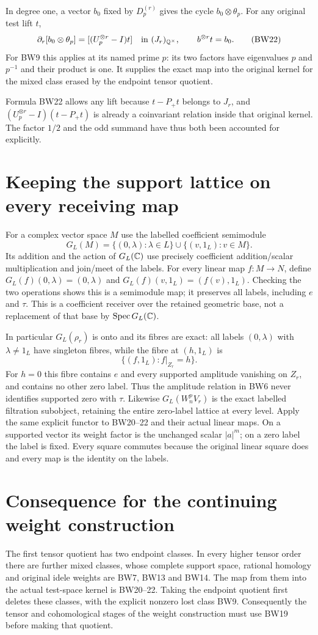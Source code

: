 In degree one, a vector $b_0$ fixed by $D_p^{(r)}$ gives the cycle
$b_0\otimes\theta_p$. For any original test lift $t$,
\[
 \partial_r[b_0\otimes\theta_p]=[(U_p^{\otimes r}-I)t]
       \quad\text{in }(J_r)_{\mathbb Q^\times},\qquad b^{\otimes r}t=b_0.
 \tag{BW22}
\]
For BW9 this applies at its named prime $p$: its two factors have
eigenvalues $p$ and $p^{-1}$ and their product is one. It supplies
the exact map into the original kernel for the mixed class erased
by the endpoint tensor quotient.

Formula BW22 allows any lift because $t-P_+t$ belongs to $J_r$,
and $(U_p^{\otimes r}-I)(t-P_+t)$ is already a coinvariant
relation inside that original kernel. The factor $1/2$ and the
odd summand have thus both been accounted for explicitly.

\section{Keeping the support lattice on every receiving map}
For a complex vector space $M$ use the labelled coefficient
semimodule
\[
 G_L(M)=\{(0,\lambda):\lambda\in L\}\cup\{(v,1_L):v\in M\}.
 \tag{BW23}
\]
Its addition and the action of $G_L(\mathbb C)$ use precisely coefficient
addition/scalar multiplication and join/meet of the labels.
For every linear map $f:M\to N$, define
$G_L(f)(0,\lambda)=(0,\lambda)$ and
$G_L(f)(v,1_L)=(f(v),1_L)$. Checking the two operations shows this
is a semimodule map; it preserves all labels, including $e$ and
$\tau$. This is a coefficient receiver over the retained geometric
base, not a replacement of that base by $\operatorname{Spec} G_L(\mathbb C)$.

In particular $G_L(\rho_r)$ is onto and its fibres are exact:
all labels $(0,\lambda)$ with $\lambda\ne1_L$ have singleton
fibres, while the fibre at $(h,1_L)$ is
\[
 \{(f,1_L):f|_{Z_r}=h\}.
 \tag{BW24}
\]
For $h=0$ this fibre contains $e$ and every supported amplitude
vanishing on $Z_r$, and contains no other zero label. Thus the
amplitude relation in BW6 never identifies supported zero with
$\tau$. Likewise $G_L(W_n^pV_r)$ is the exact labelled filtration
subobject, retaining the entire zero-label lattice at every level.
Apply the same explicit functor to BW20--22 and their actual
linear maps. On a supported vector its weight factor is the
unchanged scalar $|a|^m$; on a zero label the label is fixed.
Every square commutes because the original linear square does
and every map is the identity on the labels.

\section{Consequence for the continuing weight construction}
The first tensor quotient has two endpoint classes. In every
higher tensor order there are further mixed classes, whose
complete support space, rational homology and original idele
weights are BW7, BW13 and BW14. The map from them into the actual
test-space kernel is BW20--22. Taking the endpoint quotient first
deletes these classes, with the explicit nonzero lost class BW9.
Consequently the tensor and cohomological stages of the weight
construction must use BW19 before making that quotient.

